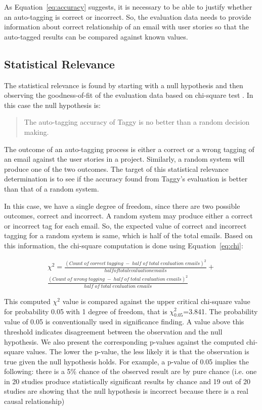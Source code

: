 As Equation~\ref{eq:accuracy} suggests, it is necessary to be able to justify whether an auto-tagging is correct or incorrect. So, the evaluation data needs to provide information about correct relationship of an email with user stories so that the auto-tagged results can be compared against  known values.

\subsection{Statistical Relevance}
The statistical relevance is found by starting with a null hypothesis and then observing the goodness-of-fit of the evaluation data based on chi-square test \cite{chi_square}. In this case the null hypothesis is:

\begin{quote}
	The auto-tagging accuracy of Taggy is no better than a random decision making.
\end{quote}

The outcome of an auto-tagging process is either a correct or a wrong tagging of an email against the user stories in a project. Similarly, a random system will produce one of the two outcomes. The target of this statistical relevance determination is to see if the accuracy found from Taggy's evaluation is better than that of a random system.

In this case, we have a single degree of freedom, since there are two possible outcomes, correct and incorrect. A random system may produce either a correct or incorrect tag for each email. So, the expected value of correct and incorrect tagging for a random system is same, which is half of the total emails. Based on this information, the chi-square computation is done using Equation~\ref{eq:chi}:

\begin{equation}
\label{eq:chi}
\begin{split}
	\chi ^ 2 = \frac {(Count \; of \; correct \; tagging \; - \; half \; of \; total \; evaluation \; emails) ^ 2} {half of total evaluation emails} +  	
\\
	\frac{(Count \; of \; wrong \; tagging \; - \; half \; of \; total \; evaluation \; emails)  ^ 2} {half \; of \; total \; evaluation \; emails}
\end{split}	
\end{equation}                                       

This computed $\chi^{2}$ value is compared against the upper critical chi-square value for probability 0.05 with 1 degree of freedom, that is $\chi^{2}_{0.05}$=3.841. The probability value of 0.05 is conventionally used in significance finding. A value above this threshold indicates disagreement between the observation and the null hypothesis. We also present the corresponding p-values against the computed chi-square values. The lower the p-value, the less likely it is that the observation is true given the null hypothesis holds. For example, a p-value of 0.05 implies the following: there is a 5\% chance of the observed result are by pure chance (i.e. one in 20 studies produce statistically significant results by chance and 19 out of 20 studies are showing that the null hypothesis is incorrect because there is a real causal relationship)


